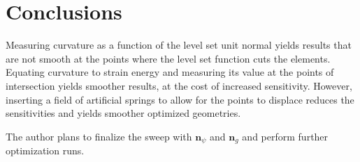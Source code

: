 \section{Conclusions}
\label{sec:curvature_conclusions}

Measuring curvature as a function of the level set unit normal yields results that are not smooth at the points where the level set function cuts the elements. Equating curvature to strain energy and measuring its value at the points of intersection yields smoother results, at the cost of increased sensitivity. However, inserting a field of artificial springs to allow for the points to displace reduces the sensitivities and yields smoother optimized geometries.

The author plans to finalize the sweep with $\mathbf{n}_{\psi}$ and $\mathbf{n}_{g}$ and perform further optimization runs.


% 


% 
% 

% 
